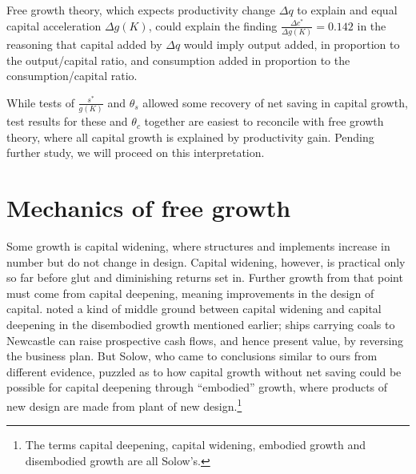 \documentclass[a4paper,fleqn]{latex_styles/cas-sc}
\begin{document}
Free growth theory, which expects productivity change \(\Delta q\) to explain and equal capital acceleration \(\Delta g(K)\), could explain the finding \(\frac{\Delta c^*}{\Delta g(K)} = 0.142\) in the reasoning that capital added by \(\Delta q\) would imply output added, in proportion to the output/capital ratio, and consumption added in proportion to the consumption/capital ratio.

While tests of \(\frac{s^*}{g(K)}\) and \(\theta_s\) allowed some recovery of net saving in capital growth, test results for these and \(\theta_c\) together are easiest to reconcile with free growth theory, where all capital growth is explained by productivity gain. Pending further study, we will proceed on this interpretation.

\FloatBarrier

\FloatBarrier

\hypertarget{mechanics-of-free-growth}{%
\section{Mechanics of free growth}\label{mechanics-of-free-growth}}

Some growth is capital widening, where structures and implements
increase in number but do not change in design. Capital widening,
however, is practical only so far before glut and diminishing returns
set in. Further growth from that point must come from capital deepening,
meaning improvements in the design of capital.
\citet{solowContributionTheoryEconomic1956a} noted a kind of middle
ground between capital widening and capital deepening in the disembodied
growth mentioned earlier; ships carrying coals to Newcastle can raise
prospective cash flows, and hence present value, by reversing the
business plan. But Solow, who came to conclusions similar to ours from
different evidence, puzzled as to how capital growth without net
saving could be possible for capital deepening through ``embodied''
growth, where products of new design are made from plant of new
design.\footnote{The terms capital deepening, capital widening, embodied
  growth and disembodied growth are all Solow's.}
\end{document}
